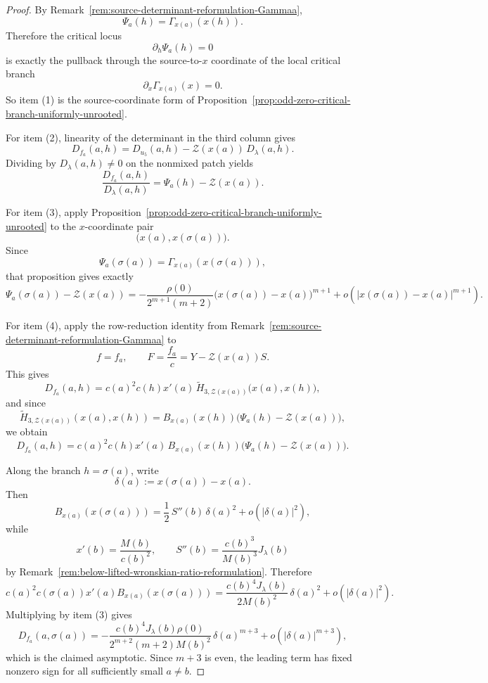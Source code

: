 \documentclass[11pt,a4paper]{amsart}
\theoremstyle{plain}
\theoremstyle{definition}
\begin{document}
\begin{proof}
By Remark~\ref{rem:source-determinant-reformulation-Gammaa},
\[
\Psi_a(h)=\Gamma_{x(a)}(x(h)).
\]
Therefore the critical locus
\[
\partial_h\Psi_a(h)=0
\]
is exactly the pullback through the source-to-$x$ coordinate of the local
critical branch
\[
\partial_x\Gamma_{x(a)}(x)=0.
\]
So item (1) is the source-coordinate form of
Proposition~\ref{prop:odd-zero-critical-branch-uniformly-unrooted}.

For item (2), linearity of the determinant in the third column gives
\[
D_{f_a}(a,h)
=
D_{u_5}(a,h)-\mathcal Z(x(a))\,D_\lambda(a,h).
\]
Dividing by $D_\lambda(a,h)\neq 0$ on the nonmixed patch yields
\[
\frac{D_{f_a}(a,h)}{D_\lambda(a,h)}
=
\Psi_a(h)-\mathcal Z(x(a)).
\]

For item (3), apply
Proposition~\ref{prop:odd-zero-critical-branch-uniformly-unrooted} to the
$x$-coordinate pair
\[
\bigl(x(a),x(\sigma(a))\bigr).
\]
Since
\[
\Psi_a(\sigma(a))=\Gamma_{x(a)}(x(\sigma(a))),
\]
that proposition gives exactly
\[
\Psi_a(\sigma(a))-\mathcal Z(x(a))
=
-\frac{\rho(0)}{2^{m+1}(m+2)}
\bigl(x(\sigma(a))-x(a)\bigr)^{m+1}
+o\!\left(\bigl|x(\sigma(a))-x(a)\bigr|^{m+1}\right).
\]

For item (4), apply the row-reduction identity from
Remark~\ref{rem:source-determinant-reformulation-Gammaa} to
\[
f=f_a,
\qquad
F=\frac{f_a}{c}=Y-\mathcal Z(x(a))S.
\]
This gives
\[
D_{f_a}(a,h)
=
c(a)^2c(h)x'(a)\,
\widetilde H_{3,\mathcal Z(x(a))}\bigl(x(a),x(h)\bigr),
\]
and since
\[
\widetilde H_{3,\mathcal Z(x(a))}(x(a),x(h))
=
B_{x(a)}(x(h))\bigl(\Psi_a(h)-\mathcal Z(x(a))\bigr),
\]
we obtain
\[
D_{f_a}(a,h)
=
c(a)^2c(h)x'(a)\,B_{x(a)}(x(h))
\bigl(\Psi_a(h)-\mathcal Z(x(a))\bigr).
\]

Along the branch $h=\sigma(a)$, write
\[
\delta(a):=x(\sigma(a))-x(a).
\]
Then
\[
B_{x(a)}(x(\sigma(a)))
=
\frac12\,S''(b)\,\delta(a)^2
+
o\!\left(|\delta(a)|^2\right),
\]
while
\[
x'(b)=\frac{M(b)}{c(b)^2},
\qquad
S''(b)=\frac{c(b)^3}{M(b)^3}J_\lambda(b)
\]
by Remark~\ref{rem:below-lifted-wronskian-ratio-reformulation}. Therefore
\[
c(a)^2c(\sigma(a))x'(a)B_{x(a)}(x(\sigma(a)))
=
\frac{c(b)^4J_\lambda(b)}{2M(b)^2}\,\delta(a)^2
+
o\!\left(|\delta(a)|^2\right).
\]
Multiplying by item (3) gives
\[
D_{f_a}(a,\sigma(a))
=
-\frac{c(b)^4J_\lambda(b)\rho(0)}{2^{m+2}(m+2)M(b)^2}\,
\delta(a)^{m+3}
+
o\!\left(|\delta(a)|^{m+3}\right),
\]
which is the claimed asymptotic. Since $m+3$ is even, the leading term has
fixed nonzero sign for all sufficiently small $a\neq b$.
\end{proof}
\end{document}
